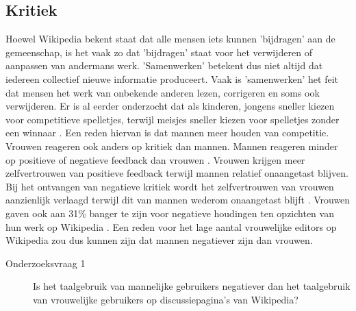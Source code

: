 \subsection{Kritiek}
Hoewel Wikipedia bekent staat dat alle mensen iets kunnen 'bijdragen' aan de gemeenschap, is het vaak zo dat 'bijdragen' staat voor het verwijderen of aanpassen van andermans werk. 'Samenwerken' betekent dus niet altijd dat iedereen collectief nieuwe informatie produceert. Vaak is 'samenwerken' het feit dat mensen het werk van onbekende anderen lezen, corrigeren en soms ook verwijderen.  Er is al eerder onderzocht dat als kinderen, jongens sneller kiezen voor competitieve spelletjes, terwijl meisjes sneller kiezen voor spelletjes zonder een winnaar \citep{campbell2013mind}. Een reden hiervan is dat mannen meer houden van competitie. Vrouwen reageren ook anders op kritiek dan mannen. Mannen reageren minder op positieve of negatieve feedback dan vrouwen \citep{roberts1994gender}. Vrouwen krijgen meer zelfvertrouwen van positieve feedback terwijl mannen relatief onaangetast blijven. Bij het ontvangen van negatieve kritiek wordt het zelfvertrouwen van vrouwen aanzienlijk verlaagd terwijl dit van mannen wederom onaangetast blijft \citep{roberts1994gender}. Vrouwen gaven ook aan 31\% banger te zijn voor negatieve houdingen ten opzichten van hun werk op Wikipedia \citep{collier2012conflict}. Een reden voor het lage aantal vrouwelijke editors op Wikipedia zou dus kunnen zijn dat mannen negatiever zijn dan vrouwen. 

\begin{description}
\item[Onderzoeksvraag 1] Is het taalgebruik van mannelijke gebruikers negatiever dan het taalgebruik van vrouwelijke gebruikers op discussiepagina's van Wikipedia?
\end{description}

